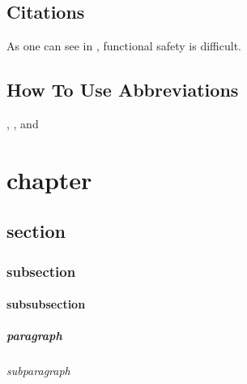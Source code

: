 \section{Citations}
\label{sec: Citations}

As one can see in \cite{iso_13849_part1}, functional safety is difficult.


\nocite{iso_13849_part1}
\nocite{iso_13849_part2}
\nocite{iso_12100}
\nocite{ISO:online}
\nocite{IEC:online}
\nocite{DIN:online}
\nocite{Isermann2010}
\nocite{francke2015internet}

\section{How To Use Abbreviations}

, , and 




\chapter{chapter}
\section{section}
\subsection{subsection}
\subsubsection{subsubsection}
\paragraph{paragraph}
\subparagraph{subparagraph}


